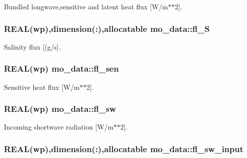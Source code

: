 Bundled longwave,sensitive and latent heat flux \mbox{[}W/m$\ast$$\ast$2\mbox{]}. 

\hypertarget{namespacemo__data_a43d6e453737affa893b8a861be921f5d}{
\subsubsection[{fl\_\-S}]{\setlength{\rightskip}{0pt plus 5cm}REAL(wp),dimension(:),allocatable {\bf mo\_\-data::fl\_\-S}}}
\label{namespacemo__data_a43d6e453737affa893b8a861be921f5d}


Salinity flux \mbox{[}(g/s\mbox{]}. 

\hypertarget{namespacemo__data_a46e3fef58a1955a30678d73ddc044c9a}{
\subsubsection[{fl\_\-sen}]{\setlength{\rightskip}{0pt plus 5cm}REAL(wp) {\bf mo\_\-data::fl\_\-sen}}}
\label{namespacemo__data_a46e3fef58a1955a30678d73ddc044c9a}


Sensitive heat flux \mbox{[}W/m$\ast$$\ast$2\mbox{]}. 

\hypertarget{namespacemo__data_a848f22357479c2be98599195b61991f7}{
\subsubsection[{fl\_\-sw}]{\setlength{\rightskip}{0pt plus 5cm}REAL(wp) {\bf mo\_\-data::fl\_\-sw}}}
\label{namespacemo__data_a848f22357479c2be98599195b61991f7}


Incoming shortwave radiation \mbox{[}W/m$\ast$$\ast$2\mbox{]}. 

\hypertarget{namespacemo__data_adbae909d2ce614966d3de6ae1eb558a0}{
\subsubsection[{fl\_\-sw\_\-input}]{\setlength{\rightskip}{0pt plus 5cm}REAL(wp),dimension(:),allocatable {\bf mo\_\-data::fl\_\-sw\_\-input}}}
\label{namespacemo__data_adbae909d2ce614966d3de6ae1eb558a0}


